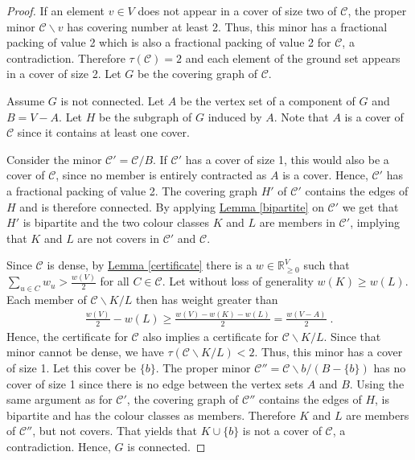 \documentclass[a4paper, 12pt, twoside=false]{scrbook}
\theoremstyle{definition}
\newcommand*{\IR}{\ensuremath{\mathbb{R}}}
\begin{document}
   \begin{proof}
       If an element $v \in V$ does not appear in a cover of size two of $\mathcal{C}$, the proper minor $\mathcal{C} \backslash v$ has covering number at least 2.
       Thus, this minor has a fractional packing of value 2 which is also a fractional packing of value 2 for $\mathcal{C}$, a contradiction.
       Therefore $\tau(\mathcal{C}) = 2$ and each element of the ground set appears in a cover of size 2.
       Let $G$ be the covering graph of $\mathcal{C}$.

       Assume $G$ is not connected.
       Let $A$ be the vertex set of a component of $G$ and $B = V - A$.
       Let $H$ be the subgraph of $G$ induced by $A$.
       Note that $A$ is a cover of $\mathcal{C}$ since it contains at least one cover.

       Consider the minor $\mathcal{C'}=\mathcal{C}/B$.
       If $\mathcal{C'}$ has a cover of size 1, this would also be a cover of $\mathcal{C}$, since no member is entirely contracted as $A$ is a cover.
       Hence, $\mathcal{C'}$ has a fractional packing of value 2.
       The covering graph $H'$ of $\mathcal{C'}$ contains the edges of $H$ and is therefore connected.
       By applying \hyperref[bipartite]{Lemma \ref*{bipartite}} on $\mathcal{C'}$ we get that $H'$ is bipartite and the two colour classes $K$ and $L$ are members in $\mathcal{C'}$, implying that $K$ and $L$ are not covers in $\mathcal{C'}$ and $\mathcal{C}$.

       Since $\mathcal{C}$ is dense, by \hyperref[certificate]{Lemma \ref*{certificate}} there is a $w \in \IR^V_{\geq 0}$ such that $\sum_{u\in C} w_u > \frac{w(V)}{2}$ for all $C \in \mathcal{C}$.
       Let without loss of generality $w(K) \geq w(L)$.
       Each member of $\mathcal{C} \backslash K / L$ then has weight greater than
       \begin{align*}
           \frac{w(V)}{2} - w(L) \geq \frac{w(V)-w(K)-w(L)}{2} = \frac{w(V-A)}{2} \;.
       \end{align*}
       Hence, the certificate for $\mathcal{C}$ also implies a certificate for $\mathcal{C}\backslash K /L$.
       Since that minor cannot be dense, we have $\tau(\mathcal{C}\backslash K /L)<2$.
       Thus, this minor has a cover of size 1.
       Let this cover be $\{b\}$.
       The proper minor $\mathcal{C''}=\mathcal{C} \backslash b / (B-\{b\})$ has no cover of size 1 since there is no edge between the vertex sets $A$ and $B$.
       Using the same argument as for $\mathcal{C'}$, the covering graph of $\mathcal{C''}$ contains the edges of $H$, is bipartite and has the colour classes as members.
       Therefore $K$ and $L$ are members of $\mathcal{C''}$, but not covers.
       That yields that $K \cup \{b\}$ is not a cover of $\mathcal{C}$, a contradiction.
       Hence, $G$ is connected.
   \end{proof}
\end{document}

